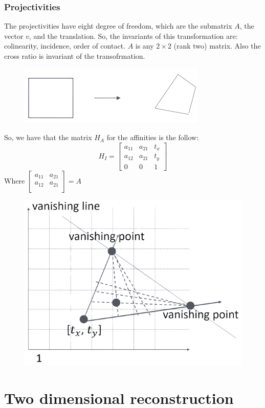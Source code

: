 \documentclass[12pt, a4paper]{report}
\newtheorem[style=M,bodystyle=\normalfont]{theorem}{Theorem}
\newtheorem[style=M,bodystyle=\normalfont]{corollary}{Corollary}
\newtheorem[style=M,bodystyle=\normalfont]{lemma}{Lemma}
\newtheorem[style=M,bodystyle=\normalfont]{definition}{Definition}
\begin{document}
    \subsection{Projectivities}
    The projectivities have eight degree of freedom, which are the submatrix $A$, the vector $v$, and the translation. So, the invariants of this transformation are: colinearity, incidence, order of contact.
    $A$ is any $2 \times 2$ (rank two) matrix. Also the cross ratio is invariant of the transofrmation.
    \begin{figure}[H]
        \centering
        \includegraphics[width=0.5\linewidth]{images/projectivities.png}
    \end{figure}
    So, we have that the matrix $H_A$ for the affinities is the follow: 
    \[H_I=
    \begin{bmatrix}
        a_{11} & a_{21} & t_x \\
        a_{12} & a_{21} & t_y \\
        0 & 0 & 1
    \end{bmatrix}\]
    Where $
    \begin{bmatrix}
        a_{11} & a_{21} \\
        a_{12} & a_{21} \\
    \end{bmatrix}
    =A$
    \begin{figure}[H]
        \centering
        \includegraphics[width=0.5\linewidth]{images/projectivities1.png}
    \end{figure}

\newpage

\chapter{Two dimensional reconstruction}
\end{document}
